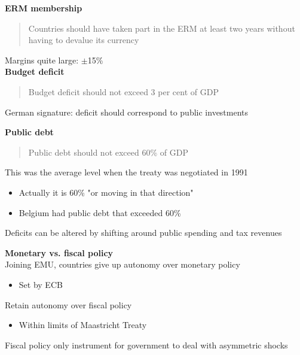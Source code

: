 \documentclass{beamer}
\begin{document}
\begin{frame} 
  \textbf{ERM membership}
  \begin{quote}
    Countries should have taken part in the ERM at least two years without having to devalue its currency 
  \end{quote}  
  \medskip
  Margins quite large: $\pm$15\% \\
  \medskip
  \textbf{Budget deficit}
  \begin{quote}
    Budget deficit should not exceed 3 per cent of GDP
  \end{quote}
   \medskip
   German signature: deficit should correspond to public investments           
\end{frame}

\begin{frame}
  \textbf{Public debt} 
  \begin{quote}
    Public debt should not exceed 60\% of GDP
  \end{quote}
  This was the average level when the treaty was negotiated in 1991
  \begin{itemize}
    \item Actually it is 60\% "or moving in that direction"
    \item Belgium had public debt that exceeded 60\%
  \end{itemize}
  \medskip
  Deficits can be altered by shifting around public spending and tax revenues
\end{frame}

\begin{frame}
  \textbf{Monetary vs. fiscal policy}\\
  \medskip
  Joining EMU, countries give up autonomy over monetary policy
  \begin{itemize}
    \item Set by ECB
  \end{itemize}
  \medskip
  Retain autonomy over fiscal policy
  \begin{itemize}
    \item Within limits of Maastricht Treaty
  \end{itemize}
  \medskip
  Fiscal policy only instrument for government to deal with asymmetric shocks
\end{frame}
\end{document}
